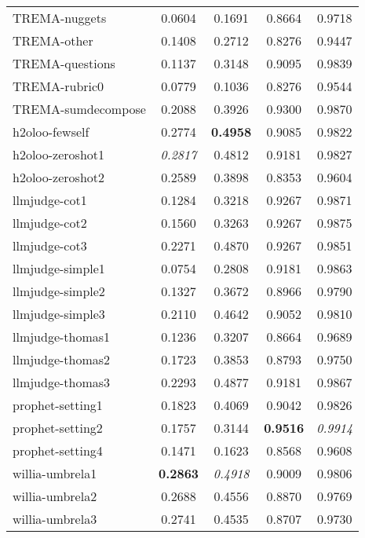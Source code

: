 \begin{table}[]
{\begin{tabular}{lcccc}
    TREMA-nuggets           & 0.0604 & 0.1691 & 0.8664 & 0.9718 \\
    TREMA-other             & 0.1408 & 0.2712 & 0.8276 & 0.9447 \\
    TREMA-questions         & 0.1137 & 0.3148 & 0.9095 & 0.9839 \\
    TREMA-rubric0           & 0.0779 & 0.1036 & 0.8276 & 0.9544 \\
    TREMA-sumdecompose      & 0.2088 & 0.3926 & 0.9300 & 0.9870 \\
    h2oloo-fewself          & 0.2774 & \textbf{0.4958} & 0.9085 & 0.9822 \\
    h2oloo-zeroshot1        & \textit{0.2817} & 0.4812 & 0.9181 & 0.9827 \\
    h2oloo-zeroshot2        & 0.2589 & 0.3898 & 0.8353 & 0.9604 \\
    llmjudge-cot1           & 0.1284 & 0.3218 & 0.9267 & 0.9871 \\
    llmjudge-cot2           & 0.1560 & 0.3263 & 0.9267 & 0.9875 \\
    llmjudge-cot3           & 0.2271 & 0.4870 & 0.9267 & 0.9851 \\
    llmjudge-simple1        & 0.0754 & 0.2808 & 0.9181 & 0.9863 \\
    llmjudge-simple2        & 0.1327 & 0.3672 & 0.8966 & 0.9790 \\
    llmjudge-simple3        & 0.2110 & 0.4642 & 0.9052 & 0.9810 \\
    llmjudge-thomas1        & 0.1236 & 0.3207 & 0.8664 & 0.9689 \\
    llmjudge-thomas2        & 0.1723 & 0.3853 & 0.8793 & 0.9750 \\
    llmjudge-thomas3        & 0.2293 & 0.4877 & 0.9181 & 0.9867 \\
    prophet-setting1        & 0.1823 & 0.4069 & 0.9042 & 0.9826 \\
    prophet-setting2        & 0.1757 & 0.3144 & \textbf{0.9516} & \textit{0.9914} \\
    prophet-setting4        & 0.1471 & 0.1623 & 0.8568 & 0.9608 \\
    willia-umbrela1         & \textbf{0.2863} & \textit{0.4918} & 0.9009 & 0.9806 \\
    willia-umbrela2         & 0.2688 & 0.4556 & 0.8870 & 0.9769 \\
    willia-umbrela3         & 0.2741 & 0.4535 & 0.8707 & 0.9730 \\
    \bottomrule
    \end{tabular}
    }
    
    \label{tab:main-results}
\end{table}